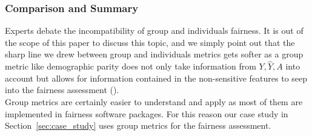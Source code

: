 

\subsubsection*{Comparison and Summary}
Experts debate the incompatibility of group and individuals fairness. %
It is out of the scope of this paper to discuss this topic, and we simply point out that the sharp line we drew between group and individuals metrics gets softer as a group metric like demographic parity does not only take information from $Y, \hat{Y}, A$ into account but allows for information contained in the non-sensitive features to seep into the fairness assessment (\cite{castelnovo2022}).\\
Group metrics are certainly easier to understand and apply as most of them are implemented in fairness software packages. For this reason our case study in Section~\ref{sec:case_study} uses group metrics for the fairness assessment.



